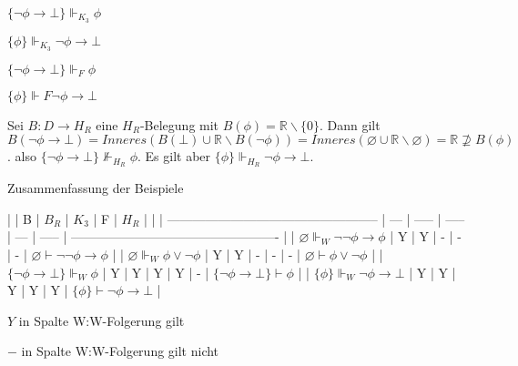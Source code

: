 \documentclass[a4paper]{article}
\begin{document}
\begin{multicols}{3}
\begin{itemize*}
\begin{itemize*}
      \item $\{\lnot\phi\rightarrow\bot\}\Vdash_{K_3} \phi$
      \item $\{\phi\}\Vdash_{K_3} \lnot\phi\rightarrow\bot$
      \item $\{\lnot\phi\rightarrow\bot\}\Vdash_F\phi$
      \item $\{\phi\}\Vdash F\lnot\phi\rightarrow\bot$
    \end{itemize*}
    \item Sei $B:D\rightarrow H_R$ eine $H_R$-Belegung mit $B(\phi) =\mathbb{R}\backslash\{0\}$. Dann gilt
    $B(\lnot\phi\rightarrow\bot) = Inneres(B(\bot )\cup \mathbb{R}\backslash B(\lnot\phi))= Inneres(\varnothing \cup \mathbb{R}\backslash\varnothing)= \mathbb{R} \not\supseteq B(\phi)$.
    also $\{\lnot\phi\rightarrow\bot\}\not\Vdash_{H_R} \phi$.
    Es gilt aber $\{\phi\}\Vdash_{H_R}\lnot \phi\rightarrow\bot$.
  \end{itemize*}

  Zusammenfassung der Beispiele

  |                                                    | B   | $B_R$ | $K_3$ | F   | $H_R$ |                                                   |
  | -------------------------------------------------- | --- | ----- | ----- | --- | ----- | ------------------------------------------------- |
  | $\varnothing\Vdash_W\lnot\lnot\phi\rightarrow\phi$ | Y   | Y     | -     | -   | -     | $\varnothing\vdash \lnot\lnot\phi\rightarrow\phi$ |
  | $\varnothing\Vdash_W\phi\vee\lnot\phi$             | Y   | Y     | -     | -   | -     | $\varnothing\vdash\phi\vee\lnot\phi$              |
  | $\{\lnot\phi\rightarrow\bot\}\Vdash_W\phi$         | Y   | Y     | Y     | Y   | -     | $\{\lnot\phi\rightarrow\bot\}\vdash\phi$          |
  | $\{\phi\}\Vdash_W\lnot\phi\rightarrow\bot$         | Y   | Y     | Y     | Y   | Y     | $\{\phi\}\vdash\lnot\phi\rightarrow\bot$          |

  \begin{itemize*}
    \item $Y$ in Spalte W:W-Folgerung gilt
    \item $-$ in Spalte W:W-Folgerung gilt nicht
  \end{itemize*}



\end{multicols}
\end{document}
